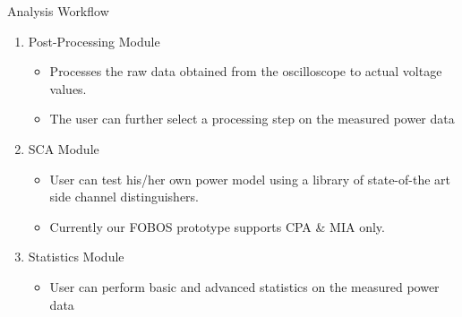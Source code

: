\documentclass[xcolor=pdftex,dvipsnames,table,final]{beamer}
\begin{document}
\begin{frame}[fragile]{}
\begin{columns}[t]
\begin{column}{.31\linewidth}
\begin{block}{Analysis Workflow}
\begin{center}
        \end{center} 
\begin{enumerate}
\item Post-Processing Module
	\begin{itemize}
	\item Processes the raw data obtained from the oscilloscope to actual voltage values.
	\item The user can further select a processing step on the measured power data
	\end{itemize}
\item SCA Module
	\begin{itemize}
	\item User can test his/her own power model using a library of state-of-the art side channel
		distinguishers.
	\item Currently our FOBOS prototype supports CPA \& MIA only.
	\end{itemize}
\item Statistics Module
	\begin{itemize}
	\item User can perform basic and advanced statistics on the measured power data
	\end{itemize}
\end{enumerate}


\end{block}
\end{column}
\end{columns}
\end{frame}
\end{document}
